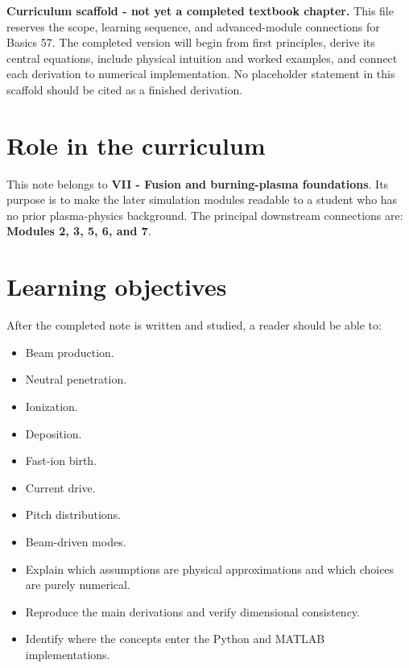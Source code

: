 \documentclass[11pt]{article}
\begin{document}

\begin{overviewbox}
\textbf{Curriculum scaffold - not yet a completed textbook chapter.} This file reserves the scope, learning sequence, and advanced-module connections for Basics 57. The completed version will begin from first principles, derive its central equations, include physical intuition and worked examples, and connect each derivation to numerical implementation. No placeholder statement in this scaffold should be cited as a finished derivation.
\end{overviewbox}

\ProjectTOC

\section{Role in the curriculum}
This note belongs to \textbf{VII - Fusion and burning-plasma foundations}. Its purpose is to make the later simulation modules readable to a student who has no prior plasma-physics background. The principal downstream connections are: \textbf{Modules 2, 3, 5, 6, and 7}.

\section{Learning objectives}
After the completed note is written and studied, a reader should be able to:
\begin{itemize}[leftmargin=1.6em]
\item Beam production.
\item Neutral penetration.
\item Ionization.
\item Deposition.
\item Fast-ion birth.
\item Current drive.
\item Pitch distributions.
\item Beam-driven modes.
\item Explain which assumptions are physical approximations and which choices are purely numerical.
\item Reproduce the main derivations and verify dimensional consistency.
\item Identify where the concepts enter the Python and MATLAB implementations.
\end{itemize}
\end{document}
